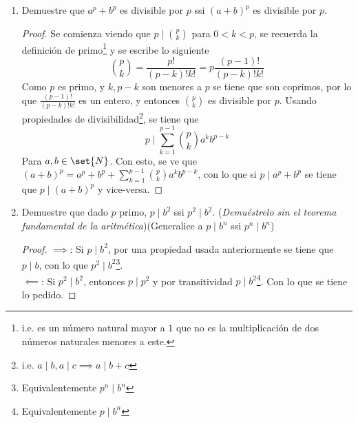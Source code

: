 \documentclass{ayudantia}
\begin{document}
\begin{enumerate}
\begin{proof}
\begin{align*}
                &(p\mid a\wedge p\mid b) &(p\mid a\wedge p\mid c)
            \end{align*}
            Con el primero se tiene que \(p\mid (a,b)\), por lo que \((a,b)>1\), lo que es una contradicción, análogamente con el segundo.
          \end{proof}
    \item Demuestre que \(a^p+b^p\) es divisible por \(p\) ssi \((a+b)^p\) es divisible por \(p\).
          \begin{proof}
            Se comienza viendo que \(p\mid\binom{p}{k}\) para \(0<k<p\), se recuerda la definición de primo\footnote{i.e. 
            es un número natural mayor a \(1\) que no es la multiplicación de dos números naturales menores a este.} y se escribe lo siguiente
            \[
                \binom{p}{k}=\frac{p!}{(p-k)!k!}=p\frac{(p-1)!}{(p-k)!k!}
            \]
            Como \(p\) es primo, y \(k,p-k\) son menores a \(p\) se tiene que son coprimos, por lo que \(\frac{(p-1)!}{(p-k)!k!}\) es un entero, y entonces \(\binom{p}{k}\) es divisible por \(p\). Usando propiedades de divisibilidad\footnote{i.e. \(a\mid b,a\mid c\implies a\mid b+c\)}, se tiene que
            \[
                p\mid\sum_{k=1}^{p-1}\binom{p}{k}a^kb^{p-k}
            \]
            Para \(a,b\in\set{N}\). Con esto, se ve que \((a+b)^p=a^p+b^p+\sum_{k=1}^{p-1}\binom{p}{k}a^kb^{p-k}\), con lo que si \(p\mid a^p+b^p\) se tiene que \(p\mid(a+b)^p\) y vice-versa.
          \end{proof}
    \item Demuestre que dado \(p\) primo, \(p\mid b^2\) ssi \(p^2\mid b^2\). (\textit{Demuéstrelo sin el teorema fundamental de la aritmética})(Generalice a \(p\mid b^n\) ssi \(p^n\mid b^n\))
          \begin{proof}
            \underline{\(\implies\)}: Si \(p\mid b^2\), por una propiedad usada anteriormente se tiene que \(p\mid b\), con lo que \(p^2\mid b^2\)\footnote{Equivalentemente \(p^n\mid b^n\)}.\\
            \underline{\(\impliedby\)}: Si \(p^2\mid b^2\), entonces \(p\mid p^2\) y por transitividad \(p\mid b^2\)\footnote{Equivalentemente \(p\mid b^n\)}. Con lo que se tiene lo pedido.
          \end{proof}
\end{enumerate}
\end{document}
